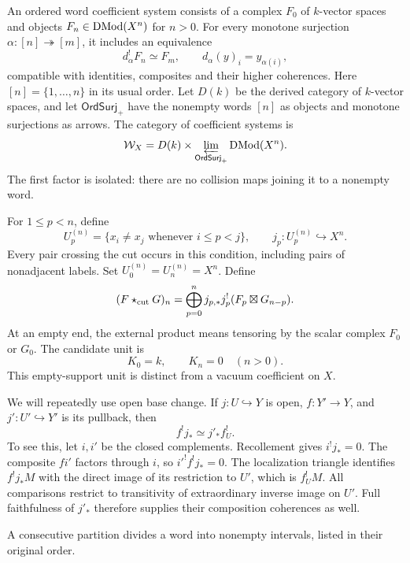 An ordered word coefficient system consists of a complex $F_0$ of
$k$-vector spaces and objects $F_n\in\operatorname{DMod}(X^n)$ for $n>0$.
For every monotone surjection $\alpha:[n]\twoheadrightarrow[m]$, it
includes an equivalence
\[
 d_\alpha^!F_n\simeq F_m,
 \qquad d_\alpha(y)_i=y_{\alpha(i)},
\]
compatible with identities, composites and their higher coherences.
Here $[n]=\{1,\ldots,n\}$ in its usual order. Let $D(k)$ be the
derived category of $k$-vector spaces, and let $\mathsf{OrdSurj}_+$
have the nonempty words $[n]$ as objects and monotone surjections
as arrows. The category of coefficient systems is
\[
 \mathcal W_X=D(k)\times
 \varprojlim_{\mathsf{OrdSurj}_+}\operatorname{DMod}(X^n).
\]
The first factor is isolated: there are no collision maps joining it
to a nonempty word.

For $1\le p<n$, define
\begin{equation}\label{cycuts:eq:opens}
 U_p^{(n)}=\{x_i\ne x_j\text{ whenever }i\le p<j\},
 \qquad j_p:U_p^{(n)}\hookrightarrow X^n.
\end{equation}
Every pair crossing the cut occurs in this condition, including pairs
of nonadjacent labels. Set $U_0^{(n)}=U_n^{(n)}=X^n$. Define
\begin{equation}\label{cycuts:eq:product}
 (F\star_{\mathrm{cut}} G)_n=
 \bigoplus_{p=0}^n j_{p,*}j_p^!(F_p\boxtimes G_{n-p}).
\end{equation}
At an empty end, the external product means tensoring by the scalar
complex $F_0$ or $G_0$. The candidate unit is
\[
 K_0=k,\qquad K_n=0\quad(n>0).
\]
This empty-support unit is distinct from a vacuum coefficient on $X$.

We will repeatedly use open base change. If $j:U\hookrightarrow Y$
is open, $f:Y'\to Y$, and $j':U'\hookrightarrow Y'$ is its pullback,
then
\begin{equation}\label{cycuts:eq:basechange}
 f^!j_*\simeq j'_*f_U^!.
\end{equation}
To see this, let $i,i'$ be the closed complements. Recollement gives
$i^!j_*=0$. The composite $fi'$ factors through $i$, so
$i'^!f^!j_*=0$. The localization triangle identifies $f^!j_*M$
with the direct image of its restriction to $U'$, which is $f_U^!M$.
All comparisons restrict to transitivity of extraordinary inverse image
on $U'$. Full faithfulness of $j'_*$ therefore supplies their composition
coherences as well.

A consecutive partition divides a word into nonempty intervals,
listed in their original order.

